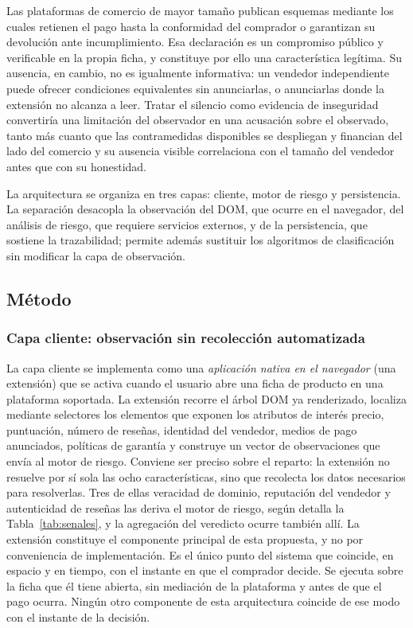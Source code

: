 Las plataformas de comercio de mayor tamaño publican esquemas mediante los cuales retienen el
pago hasta la conformidad del comprador o garantizan su devolución ante incumplimiento. Esa
declaración es un compromiso público y verificable en la propia ficha, y constituye por ello
una característica legítima. Su ausencia, en cambio, no es igualmente informativa: un vendedor
independiente puede ofrecer condiciones equivalentes sin anunciarlas, o anunciarlas donde la
extensión no alcanza a leer. Tratar el silencio como evidencia de inseguridad convertiría una
limitación del observador en una acusación sobre el observado, tanto más cuanto que las
contramedidas disponibles se despliegan y financian del lado del comercio \cite{ref30} y su
ausencia visible correlaciona con el tamaño del vendedor antes que con su honestidad.

La arquitectura se organiza en tres capas: cliente, motor de riesgo y persistencia. La
separación desacopla la observación del DOM, que ocurre en el navegador, del análisis de
riesgo, que requiere servicios externos, y de la persistencia, que sostiene la trazabilidad;
permite además sustituir los algoritmos de clasificación sin modificar la capa de observación.

\subsection{Método}

\subsubsection{Capa cliente: observación sin recolección automatizada}

La capa cliente se implementa como una \emph{aplicación nativa en el navegador} (una
extensión) que se activa cuando el usuario abre una ficha de producto en una plataforma
soportada. La extensión recorre el árbol DOM ya renderizado, localiza mediante selectores los
elementos que exponen los atributos de interés precio, puntuación, número de reseñas,
identidad del vendedor, medios de pago anunciados, políticas de garantía y construye un
vector de observaciones que envía al motor de riesgo. Conviene ser preciso sobre el reparto:
la extensión no resuelve por sí sola las ocho características, sino que recolecta los datos
necesarios para resolverlas. Tres de ellas veracidad de dominio, reputación del vendedor y
autenticidad de reseñas las deriva el motor de riesgo, según detalla la
Tabla~\ref{tab:senales}, y la agregación del veredicto ocurre también allí. La extensión constituye el componente
principal de esta propuesta, y no por conveniencia de implementación. Es el único punto del
sistema que coincide, en espacio y en tiempo, con el instante en que el comprador decide.
Se ejecuta sobre la ficha que él tiene abierta, sin mediación de la plataforma y antes de que el
pago ocurra. Ningún otro componente de esta arquitectura coincide de ese modo con el
instante de la decisión.

